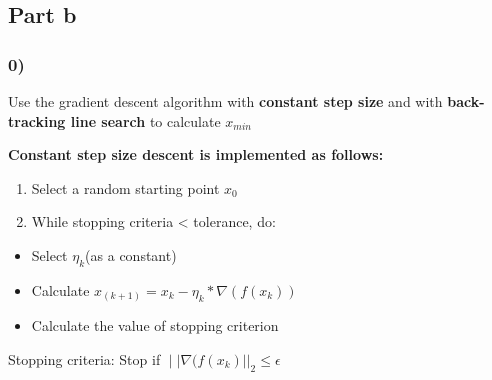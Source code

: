 \documentclass[
  letterpaper,
  DIV=11,
  numbers=noendperiod]{scrartcl}
\providecommand{\tightlist}{%
  \setlength{\itemsep}{0pt}\setlength{\parskip}{0pt}}\usepackage{longtable,booktabs,array}
\begin{document}
\subsection{Part b}\label{part-b}

\subsubsection{0)}\label{section}

Use the gradient descent algorithm with \textbf{constant step size} and
with \textbf{back-tracking line search} to calculate \(x_{min}\)

\textbf{Constant step size descent is implemented as follows:}

\begin{enumerate}
\def\labelenumi{\arabic{enumi}.}
\tightlist
\item
  Select a random starting point \(x_0\)\\
\item
  While stopping criteria \textless{} tolerance, do:
\end{enumerate}

\begin{itemize}
\tightlist
\item
  Select \(η_k\)(as a constant)\\
\item
  Calculate \(x_{(k+1)} = x_k - η_k * ∇(f(x_k))\)\\
\item
  Calculate the value of stopping criterion
\end{itemize}

Stopping criteria: Stop if \(∣|∇(f(x_k)||_2 ≤ ϵ\)
\end{document}
